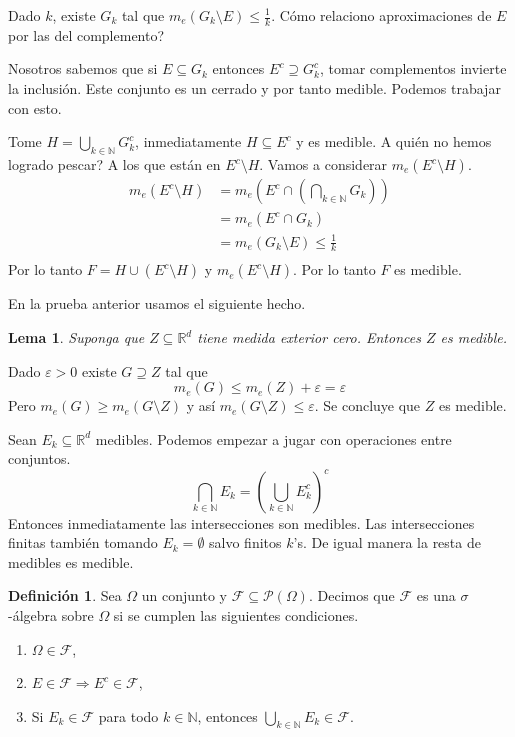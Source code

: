 \documentclass[12pt]{article}
\theoremstyle{plain}
\newtheorem{Lem}[Th]{Lema}             %
\theoremstyle{definition}
\newtheorem{Def}[Th]{Definición}       %
\theoremstyle{remark}
\numberwithin{equation}{section}
\newcommand{\Om}{\varOmega}         %
\newcommand{\bN}{\mathbb{N}}        %
\newcommand{\bR}{\mathbb{R}}        %
\newcommand{\cF}{\mathcal{F}}       %
\newcommand{\cP}{\mathcal{P}}       %
\renewcommand{\geq}{\geqslant}      %
\renewcommand{\leq}{\leqslant}      %
\renewcommand{\:}{\colon}           %
\begin{document}
\begin{multicols}{2}
\begin{ptcbp}
Dado $k$, existe $G_k$ tal que $m_e(G_k\setminus E)\leq \frac{1}{k}$. Cómo relaciono aproximaciones de $E$ por las del complemento?\par
 Nosotros sabemos que si $E\subseteq G_k$ entonces $E^c\supseteq G_k^c$, tomar complementos invierte la inclusión. Este conjunto es un cerrado y por tanto medible. Podemos trabajar con esto.\par
Tome $H=\bigcup_{k\in\bN}G_k^c$, inmediatamente $H\subseteq E^c$ y es medible. A quién no hemos logrado pescar? A los que están en $E^c\setminus H$. Vamos a considerar $m_e(E^c\setminus H)$.
\begin{align*}
  m_e(E^c\setminus H) & =m_e\left(E^c\cap\left(\bigcap_{k\in\bN}G_k\right)\right)\\
  & =m_e(E^c\cap G_k)\\
  & =m_e(G_k\setminus E)\leq\frac{1}{k}\\
\end{align*}
Por lo tanto $F=H\cup(E^c\setminus H)$ y $m_e(E^c\setminus H)$. Por lo tanto $F$ es medible.
\end{ptcbp}

En la prueba anterior usamos el siguiente hecho.

\begin{Lem}
  Suponga que $Z\subseteq\bR^d$ tiene medida exterior cero. Entonces $Z$ es medible.
\end{Lem}

\begin{ptcbp}
Dado $\varepsilon>0$ existe $G\supseteq Z$ tal que
$$m_e(G)\leq m_e(Z)+\varepsilon=\varepsilon$$
Pero $m_e(G)\geq m_e(G\setminus Z)$ y así $m_e(G\setminus Z)\leq \varepsilon$. Se concluye que $Z$ es medible.
\end{ptcbp}

Sean $E_k\subseteq\bR^d$ medibles. Podemos empezar a jugar con operaciones entre conjuntos.
$$\bigcap_{k\in\bN}E_k=\left(\bigcup_{k\in\bN}E_k^c\right)^c$$
Entonces inmediatamente las intersecciones son medibles. Las intersecciones finitas también tomando $E_k=\emptyset$ salvo finitos $k$'s. De igual manera la resta de medibles es medible.

\begin{Def}
  Sea $\Om$ un conjunto y $\cF\subseteq\cP(\Om)$. Decimos que $\cF$ es una $\sigma$-álgebra sobre $\Om$ si se cumplen las siguientes condiciones.
  \begin{enumerate}
    \item $\Om\in\cF$,
    \item $E\in\cF\Rightarrow E^c\in\cF$,
    \item Si $E_k\in \cF$ para todo $k\in\bN$, entonces $\bigcup_{k\in\bN} E_k\in \cF$.
  \end{enumerate}
\end{Def}


\end{multicols}
\end{document}
